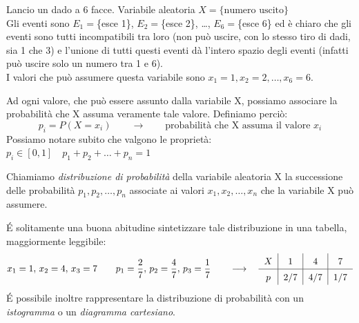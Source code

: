 \begin{esempio} Lancio un dado a 6 facce. Variabile aleatoria \(X=\{\text{numero uscito}\}\)\\[3pt]
Gli eventi sono \(E_1 = \)\{esce 1\}, \(E_2 = \)\{esce 2\}, \dots, \(E_6 = \)\{esce 6\} ed è chiaro che gli eventi sono tutti incompatibili tra loro (non può uscire, con lo stesso tiro di dadi, sia 1 che 3) e l'unione di tutti questi eventi dà l'intero spazio degli eventi (infatti può uscire solo un numero tra 1 e 6). \\I valori che può assumere questa variabile sono \(x_1=1, x_2=2, \dots, x_6=6\).
\end{esempio}

Ad ogni valore, che può essere assunto dalla variabile X, possiamo associare la probabilità che X assuma veramente tale valore. Definiamo perciò:
\[\boxed{p_i = P(X=x_i)} \qquad \longrightarrow \qquad \text{probabilità che X assuma il valore \(x_i\)}\]
Possiamo notare subito che valgono le proprietà: \qquad\(\boxed{p_i \in [0,1]} \quad \boxed{p_1+p_2+\dots+p_n=1}\) 

\begin{definizione}Chiamiamo \emph{distribuzione di probabilità} della variabile aleatoria X la successione delle probabilità \(p_1,p_2,\dots,p_n\) associate ai valori \(x_1,x_2,\dots,x_n\) che la variabile X può assumere. 
\end{definizione}

\'E solitamente una buona abitudine sintetizzare tale distribuzione in una tabella, maggiormente leggibile:
\[x_1=1,\, x_2=4,\, x_3 = 7 \qquad p_1=\dfrac{2}{7},\, p_2 = \dfrac{4}{7},\, p_3 = \dfrac{1}{7} \qquad \longrightarrow \quad 
\renewcommand\arraystretch{1.4}
\setlength\arraycolsep{25pt}
\begin{tabular}{c|c|c|c}
\(X\) & 1 & 4 & 7\\
\hline
\(p\) & 2/7 & 4/7 & 1/7\\
\end{tabular}\]
\'E possibile inoltre rappresentare la distribuzione di probabilità con un \emph{istogramma} o un \emph{diagramma cartesiano}.

